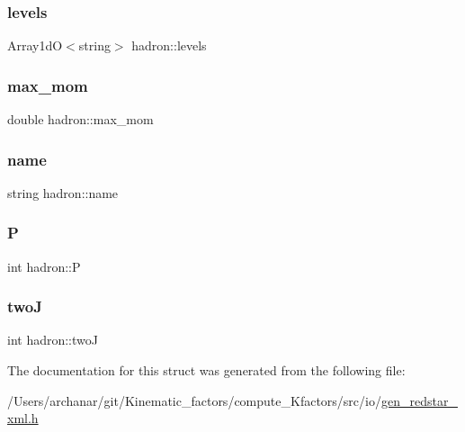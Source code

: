 \mbox{\label{structhadron_a03809869ad25124ab0152666ea633315}} 
\subsubsection{\texorpdfstring{levels}{levels}}
{\footnotesize\ttfamily Array1dO$<$string$>$ hadron\+::levels}

\mbox{\label{structhadron_a668b950b7a48e196a051668114687d70}} 
\subsubsection{\texorpdfstring{max\_mom}{max\_mom}}
{\footnotesize\ttfamily double hadron\+::max\+\_\+mom}

\mbox{\label{structhadron_a1723945a53bf31a89bae3915bfed013c}} 
\subsubsection{\texorpdfstring{name}{name}}
{\footnotesize\ttfamily string hadron\+::name}

\mbox{\label{structhadron_a317d83c6257a8452f70b2251ec784715}} 
\subsubsection{\texorpdfstring{P}{P}}
{\footnotesize\ttfamily int hadron\+::P}

\mbox{\label{structhadron_ae190a1452b80921c1fc32bbfb805ae9d}} 
\subsubsection{\texorpdfstring{twoJ}{twoJ}}
{\footnotesize\ttfamily int hadron\+::twoJ}



The documentation for this struct was generated from the following file\+:\begin{DoxyCompactItemize}
\item 
/\+Users/archanar/git/\+Kinematic\+\_\+factors/compute\+\_\+\+Kfactors/src/io/\mbox{\hyperlink{gen__redstar__xml_8h}{gen\+\_\+redstar\+\_\+xml.\+h}}\end{DoxyCompactItemize}
